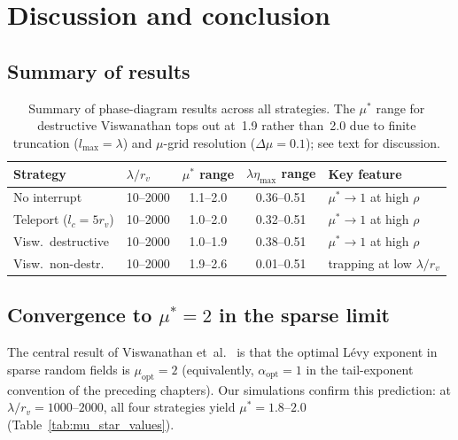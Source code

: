 \chapter{Discussion and conclusion}
\label{ch:discussion}

\section{Summary of results}

\begin{table}[htb]
\centering
\small
\begin{tabular}{llccl}
\toprule
Strategy & $\lambda/r_v$ & $\mu^*$ range & $\lambda\eta_{\max}$ range & Key feature \\
\midrule
No interrupt          & 10--2000 & 1.1--2.0 & 0.36--0.51 & $\mu^* \to 1$ at high $\rho$ \\
Teleport ($l_c=5r_v$) & 10--2000 & 1.0--2.0 & 0.32--0.51 & $\mu^* \to 1$ at high $\rho$ \\
Visw.\ destructive    & 10--2000 & 1.0--1.9 & 0.38--0.51 & $\mu^* \to 1$ at high $\rho$ \\
Visw.\ non-destr.     & 10--2000 & 1.9--2.6 & 0.01--0.51 & trapping at low $\lambda/r_v$ \\
\bottomrule
\end{tabular}
\caption{Summary of phase-diagram results across all strategies.
         The $\mu^*$ range for destructive Viswanathan tops out
         at~1.9 rather than~2.0 due to finite truncation
         ($l_{\max} = \lambda$) and $\mu$-grid resolution
         ($\Delta\mu = 0.1$); see text for discussion.}
\label{tab:summary}
\end{table}

\section{Convergence to $\mu^* = 2$ in the sparse limit}

The central result of Viswanathan et~al.~\cite{viswanathan1999optimizing}
is that the optimal L\'evy exponent in sparse random fields is
$\mu_{\mathrm{opt}} = 2$ (equivalently, $\alpha_{\mathrm{opt}} = 1$
in the tail-exponent convention of the preceding chapters).
Our simulations confirm this prediction: at
$\lambda/r_v = 1000$--$2000$, all four strategies yield
$\mu^* = 1.8$--$2.0$ (Table~\ref{tab:mu_star_values}).

